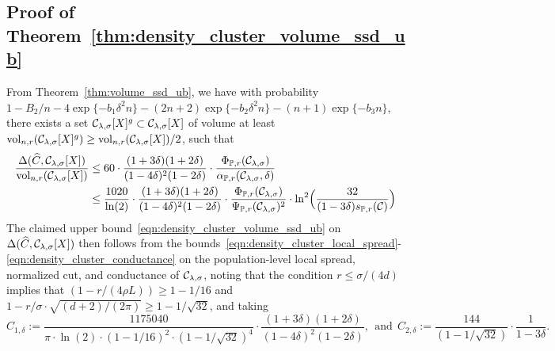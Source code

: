 \subsection{Proof of Theorem~\ref{thm:density_cluster_volume_ssd_ub}}
From Theorem~\ref{thm:volume_ssd_ub}, we have with probability $1 - B_2/n - 4\exp\{-b_1\delta^2n\} - (2n + 2)\exp\{-b_2\delta^2n\} - (n + 1)\exp\{-b_3n\}$, there exists a set $\mathcal{C}_{\lambda,\sigma}[X]^g \subset \mathcal{C}_{\lambda,\sigma}[X]$ of volume at least $\mathrm{vol}_{n,r}(\mathcal{C}_{\lambda,\sigma}[X]^g) \geq \mathrm{vol}_{n,r}(\mathcal{C}_{\lambda,\sigma}[X])/2$, such that
\begin{align*}
\frac{\Delta(\widehat{C},\mathcal{C}_{\lambda,\sigma}[X])}{\mathrm{vol}_{n,r}(\mathcal{C}_{\lambda,\sigma}[X])} & \leq 60 \cdot \frac{(1 + 3\delta)(1 + 2\delta)}{(1 - 4\delta)^2(1 - 2\delta)} \cdot \frac{\Phi_{\mathbb{P},r}(\mathcal{C}_{\lambda,\sigma})}{\alpha_{\mathbb{P},r}(\mathcal{C}_{\lambda,\sigma},\delta)} \\
& \leq \frac{1020}{\ln(2)} \cdot \frac{(1 + 3\delta)(1 + 2\delta)}{(1 - 4\delta)^2(1 - 2\delta)} \cdot \frac{\Phi_{\mathbb{P},r}(\mathcal{C}_{\lambda,\sigma})}{\Psi_{\mathbb{P},r}(\mathcal{C}_{\lambda,\sigma})^2} \cdot \ln^2\Bigl(\frac{32}{(1 - 3\delta) s_{\mathbb{P},r}(\mathcal{C})}\Bigr)
\end{align*}
The claimed upper bound~\eqref{eqn:density_cluster_volume_ssd_ub} on $\Delta(\widehat{C},\mathcal{C}_{\lambda,\sigma}[X])$ then follows from the bounds~\eqref{eqn:density_cluster_local_spread}-\eqref{eqn:density_cluster_conductance} on the population-level local spread, normalized cut, and conductance of $\mathcal{C}_{\lambda,\sigma}$, noting that the condition $r \leq \sigma/(4d)$ implies that $(1 - r/(4\rho L)) \geq 1 - 1/16$ and $1 - r/\sigma \cdot \sqrt{(d + 2)/(2\pi)} \geq 1 - 1/\sqrt{32}$, and taking
\begin{equation*}
C_{1,\delta} := \frac{1175040}{\pi \cdot \ln(2) \cdot (1 - 1/16)^2 \cdot (1 - 1/\sqrt{32})^4} \cdot \frac{(1 + 3\delta)(1 + 2\delta)}{(1 - 4\delta)^2(1 - 2\delta)},~~\textrm{and}~~C_{2,\delta} := \frac{144}{(1 - 1/\sqrt{32})} \cdot \frac{1}{1-3\delta}.
\end{equation*}

